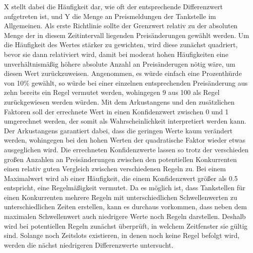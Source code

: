 X stellt dabei die Häufigkeit dar, wie oft der entsprechende Differenzwert aufgetreten ist, und Y die Menge an Preismeldungen der Tankstelle im Allgemeinen. Als erste Richtlinie sollte der Grenzwert relativ zu der absoluten Menge der in diesem Zeitintervall liegenden Preisänderungen gewählt werden. Um die Häufigkeit des Wertes stärker zu gewichten, wird diese zunächst quadriert, bevor sie dann relativiert wird, damit bei moderat hohen Häufigkeiten eine unverhältnismäßig höhere absolute Anzahl an Preisänderugen nötig wäre, um diesen Wert zurückzuweisen. Angenommen, es würde einfach eine Prozenthürde von 10\% gewählt, so würde bei einer einzelnen entsprechenden Preisänderung aus zehn bereits ein Regel vermutet werden, wohingegen 9 aus 100 als Regel zurückgewiesen werden würden. Mit dem Arkustangens und den zusätzlichen Faktoren soll der errechnete Wert in einen Konfidenzwert zwischen 0 und 1 umgerechnet werden, der somit als Wahrscheinlichkeit interpretiert werden kann. Der Arkustangens garantiert dabei, dass die geringen Werte kaum verändert werden, wohingegen bei den hohen Werten der quadratische Faktor wieder etwas ausgeglichen wird. Die errechneten Konfidenzwerte lassen so trotz der verschieden großen Anzahlen an Preisänderungen zwischen den potentiellen Konkurrenten einen relativ guten Vergleich zwischen verschiedenen Regeln zu. Bei einem Maximalwert wird ab einer Häufigkeit, die einem Konfidenzwert größer als 0.5 entspricht, eine Regelmäßigkeit vermutet. Da es möglich ist, dass Tankstellen für einen Konkurrenten mehrere Regeln mit unterschiedlichen Schwellenwerten zu unterschiedlichen Zeiten erstellen, kann es durchaus vorkommen, dass neben dem maximalen Schwellenwert auch niedrigere Werte noch Regeln darstellen. Deshalb wird bei potentiellen Regeln zunächst überprüft, in welchem Zeitfenster sie gültig sind. Solange noch Zeitslots existieren, in denen noch keine Regel befolgt wird, werden die nächst niedrigeren Differenzwerte untersucht. 

